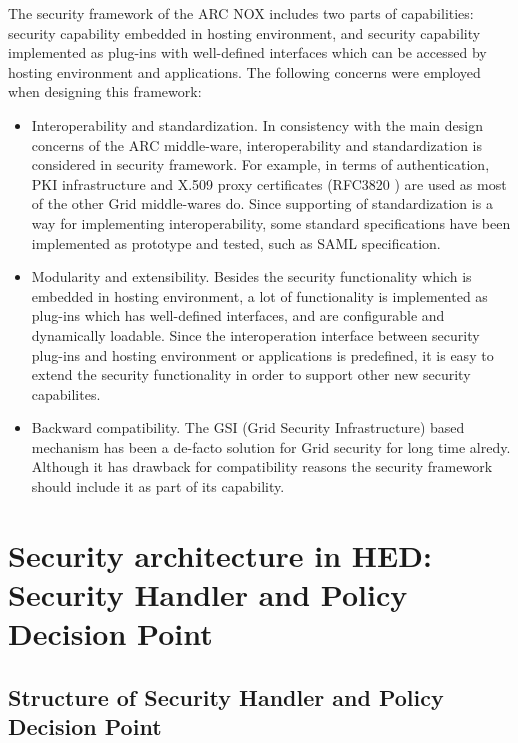 \documentclass{article}                            %
\begin{document}
The security framework of the ARC NOX includes two parts of capabilities: security capability embedded in hosting environment, and security capability implemented as plug-ins with well-defined interfaces which can be accessed by hosting environment and applications. The following concerns were employed when designing this framework:

\begin{itemize}
    \item Interoperability and standardization. In consistency with the main design concerns of the ARC middle-ware, interoperability and standardization is considered in security framework. For example, in terms of authentication, PKI infrastructure and X.509 proxy certificates (RFC3820 \cite{x509proxy}) are used as most of the other Grid middle-wares do. Since supporting of standardization is a way for implementing interoperability, some standard specifications have been implemented as prototype and tested, such as SAML specification.

    \item Modularity and extensibility. Besides the security functionality which is embedded in hosting environment, a lot of functionality is implemented as plug-ins which has well-defined interfaces, and are configurable and dynamically loadable. Since the interoperation interface between security plug-ins and hosting environment or applications is predefined, it is easy to extend the security functionality in order to support other new security capabilites.

    \item Backward compatibility. The GSI (Grid Security Infrastructure)\cite{gsi} based mechanism has been a de-facto solution for Grid security for long time alredy. Although it has drawback for compatibility reasons the security framework should include it as part of its capability.

\end{itemize}


\section{Security architecture in HED: Security Handler and Policy Decision Point} %
\label{sec:sec_architecture}


\subsection{Structure of Security Handler and Policy Decision  Point} %
\label{subsec:structure_sechandler}
\end{document}
